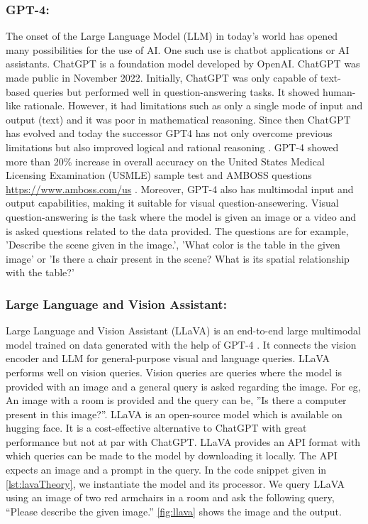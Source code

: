 \subsubsection{GPT-4:}
The onset of the Large Language Model (LLM) in today's world has opened many possibilities for the use of AI. One such use is chatbot applications or AI
assistants. ChatGPT is a foundation model developed by OpenAI. ChatGPT was made public in November 2022. Initially, ChatGPT was only capable of 
text-based queries but performed well in question-answering tasks. It showed human-like rationale. However, it had limitations such as 
only a single mode of input and output (text) and it was poor in mathematical reasoning. Since then ChatGPT has evolved and today the successor 
GPT4 has not only overcome previous limitations but also improved logical and rational reasoning \cite{openai2024gpt4technicalreport}. GPT-4 showed more than 20\% increase in overall accuracy
on the  United States Medical Licensing Examination (USMLE) sample test and AMBOSS questions \url{https://www.amboss.com/us} \cite{Penny2024-qx}. Moreover, GPT-4 
also has multimodal input and output capabilities, making it suitable for visual question-ansewering. Visual question-answering is the task where
the model is given an image or a video and is asked questions related to the data provided. The questions are for example, 'Describe the scene given in 
the image.', 'What color is the table in the given image' or 'Is there a chair present in the scene? What is its spatial relationship with the table?'

\subsubsection{Large Language and Vision Assistant:}
 Large Language and Vision Assistant (LLaVA) is an end-to-end large multimodal model trained on data generated with the help of GPT-4 \cite{liu2023visualinstructiontuning}. 
 It connects the vision encoder and LLM for general-purpose visual and language queries. LLaVA performs well on vision queries. 
 Vision queries are queries where the model is provided with an image and a general query is asked regarding the image. 
 For eg, An image with a room is provided and the query can be, ”Is there a computer present in this image?”. LLaVA is an open-source model which is available on
 hugging face. It is a cost-effective alternative to ChatGPT with great performance but not at par with ChatGPT. LLaVA provides an API format with which queries can be made
 to the model by downloading it locally. The API expects an image and a prompt in the query. In the code snippet given in \cref{lst:lavaTheory}, we instantiate the model and its processor. We
 query LLaVA using an image of two red armchairs in a room and ask the following query, \enquote{Please describe the given image.} \cref{fig:llava} shows the image
 and the output.  


